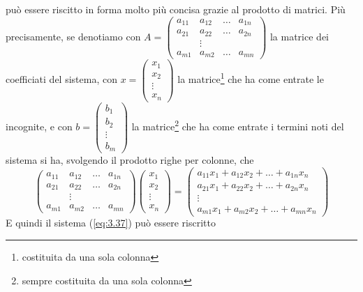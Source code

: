 può essere riscitto in forma molto più concisa grazie al prodotto di matrici. Più precisamente, se denotiamo con
$A=
\begin{pmatrix}
  a_{11} & a_{12} & \dots & a_{1n}\\
  a_{21} & a_{22} & \dots & a_{2n}\\
         &\vdots\\
  a_{m1} & a_{m2} & \dots & a_{mn}
\end{pmatrix}
$ la matrice dei coefficiati del sistema, con $x=
\begin{pmatrix}
  x_1\\
  x_2\\
  \vdots\\
  x_n
\end{pmatrix}
$ la matrice\footnote{costituita da una sola colonna} che ha come entrate le incognite, e con $b=
\begin{pmatrix}
  b_1\\
  b_2\\
  \vdots\\
  b_m
\end{pmatrix}
$ la matrice\footnote{sempre costituita da una sola colonna} che ha come entrate i termini noti del sistema si ha,
svolgendo il prodotto righe per colonne, che
\begin{equation*}
    \begin{pmatrix}
        a_{11} & a_{12} & \dots & a_{1n}\\
        a_{21} & a_{22} & \dots & a_{2n}\\
                &\vdots\\
        a_{m1} & a_{m2} & \dots & a_{mn}
    \end{pmatrix}
    \begin{pmatrix}
        x_1\\
        x_2\\
        \vdots\\
        x_n
    \end{pmatrix}=
    \begin{pmatrix}
        a_{11}x_1+a_{12}x_2+\dots+a_{1n}x_n\\ 
        a_{21}x_1+a_{22}x_2+\dots+a_{2n}x_n\\
        \vdots\\
        a_{m1}x_1+a_{m2}x_2+\dots+a_{mn}x_n
    \end{pmatrix}
\end{equation*}
E quindi il sistema (\ref{eq:3.37}) può essere riscritto
